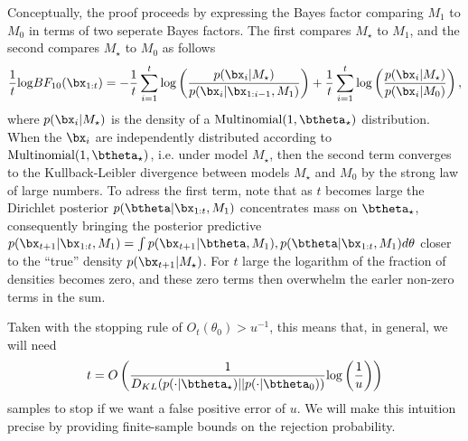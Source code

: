 \documentclass[11pt]{article}
\def\log{{\rm log}}
\begin{document}
Conceptually, the proof proceeds by expressing the Bayes factor comparing $M_1$ to $M_0$ in terms of two seperate Bayes factors.
The first compares $M_{\star}$ to $M_1$, and the second compares $M_{\star}$ to $M_0$ as follows
\begin{align*}
 \frac{1}{t} \log BF_{10}(\bx_{1:t}) = - \frac{1}{t}\sum_{i=1}^{t}\log \left( \frac{p(\bx_{i}|M_\star)}{p(\bx_{i}|\bx_{1:i-1},M_1)}\right) + \frac{1}{t}\sum_{i=1}^{t} \log  \left( \frac{p(\bx_{i}|M_\star)}{p(\bx_{i}|M_0)}\right),\\
\end{align*}
where  $p(\bx_i|M_\star)$ is the density of a $\text{Multinomial}(1,\btheta_{\star})$ distribution.
When the $\bx_i$ are independently distributed according to $\text{Multinomial}(1, \btheta_\star)$, i.e.
under model $M_\star$, then the second term converges to the Kullback-Leibler divergence between models $M_\star$ and $M_0$ by the strong law of large numbers.
To adress the first term, note that as $t$ becomes large the Dirichlet posterior $p(\btheta|\bx_{1:t}, M_1)$ concentrates mass on $\btheta_\star$, consequently bringing the posterior predictive $p(\bx_{t+1}|\bx_{1:t},M_1) =\int p(\bx_{t+1}|\btheta,M_1),p(\btheta|\bx_{1:t},M_1) d\theta$ closer to the ``true'' density $p(\bx_{t+1}|M_{\star})$.
For $t$ large the logarithm of the fraction of densities becomes zero, and these zero terms then overwhelm the earler non-zero terms in the sum.


Taken with the stopping rule of $O_t(\theta_0)>u^{-1}$, this means that, in general, we will need
\[
  t=O\left(\frac{1}{D_{KL}(p(\cdot|\btheta_{\star}) || p(\cdot|\btheta_0))} \log\left(\frac{1}{u}\right)\right)
\]
samples to stop if we want a false positive error of $u$. We will make this intuition precise by providing finite-sample bounds on the rejection probability.
\end{document}
